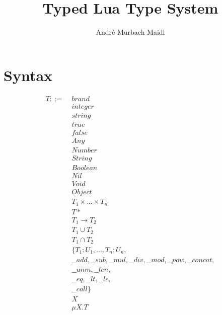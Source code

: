 \documentclass[12pt]{article}
\title{Typed Lua Type System}
\author{André Murbach Maidl}
\begin{document}
\maketitle

\section{Syntax}

\begin{align*}
T ::= \; & brand\\
& integer\\
& string\\
& true\\
& false\\
& Any\\
& Number\\
& String\\
& Boolean\\
& Nil\\
& Void\\
& Object\\
& T_1 \times ... \times T_n\\
& T*\\
& T_1 \rightarrow T_2\\
& T_1 \cup T_2\\
& T_1 \cap T_2\\
& \{ T_1:U_1, ..., T_n:U_n, \\
& \_\_add, \_\_sub, \_\_mul, \_\_div, \_\_mod, \_\_pow, \_\_concat, \\
& \_\_unm, \_\_len, \\
& \_\_eq, \_\_lt, \_\_le, \\
& \_\_call \}\\
& X\\
& \mu X.T\\
\end{align*}
\end{document}
